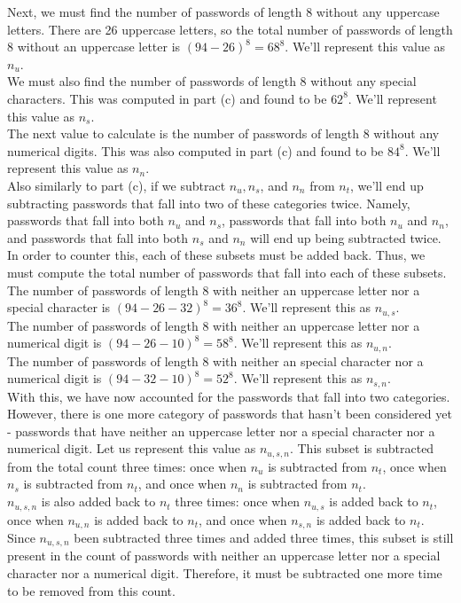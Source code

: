 \documentclass[11pt]{article}
\theoremstyle{definition}
\begin{document}
\begin{enumerate}
\begin{enumerate}
Next, we must find the number of passwords of length 8 without any uppercase letters. There are 26 uppercase letters, so the total number of passwords of length 8 without an uppercase letter is $(94 - 26)^8 = 68^8$.
We'll represent this value as $n_{u}$.\\

We must also find the number of passwords of length 8 without any special characters. This was computed in part (c) and found to be $62^8$. We'll represent this value as $n_{s}$.\\

The next value to calculate is the number of passwords of length 8 without any numerical digits. This was also computed in part (c) and found to be $84^8$. We'll represent this value as $n_{n}$.\\

Also similarly to part (c), if we subtract $n_{u}, n_{s}$, and $n_{n}$ from $n_{t}$, we'll end up subtracting passwords that fall into two of these categories twice. Namely,
passwords that fall into both $n_{u}$ and $n_{s}$, passwords that fall into both $n_{u}$ and $n_{n}$, and passwords that fall into both $n_{s}$ and $n_{n}$ will end up
being subtracted twice. In order to counter this, each of these subsets must be added back. Thus, we must compute the total number of passwords that fall into each of these subsets.\\

The number of passwords of length 8 with neither an uppercase letter nor a special character is $(94 - 26 - 32)^8 = 36^8$. We'll represent this as $n_{u, s}$.\\

The number of passwords of length 8 with neither an uppercase letter nor a numerical digit is $(94 - 26 - 10)^8 = 58^8$. We'll represent this as $n_{u, n}$.\\

The number of passwords of length 8 with neither an special character nor a numerical digit is $(94 - 32 - 10)^8 = 52^8$. We'll represent this as $n_{s, n}$.\\

With this, we have now accounted for the passwords that fall into two categories. However, there is one more category of passwords that hasn't been considered yet - passwords that have neither an uppercase letter
nor a special character nor a numerical digit. Let us represent this value as $n_{u,s,n}$. This subset is subtracted from the total count three times: once when $n_{u}$ is subtracted from $n_{t}$,
once when $n_{s}$ is subtracted from $n_{t}$, and once when $n_{n}$ is subtracted from $n_{t}$.\\
$n_{u,s,n}$ is also added back to $n_{t}$ three times: once when $n_{u,s}$ is added back to $n_{t}$, once when $n_{u,n}$ is added back to $n_{t}$, and
once when $n_{s,n}$ is added back to $n_{t}$. Since $n_{u,s,n}$ been subtracted three times and added three times, this subset is still present in the count of passwords
with neither an uppercase letter nor a special character nor a numerical digit. Therefore, it must be subtracted one more time to be removed from this count.\\


\end{enumerate}
\end{enumerate}
\end{document}

